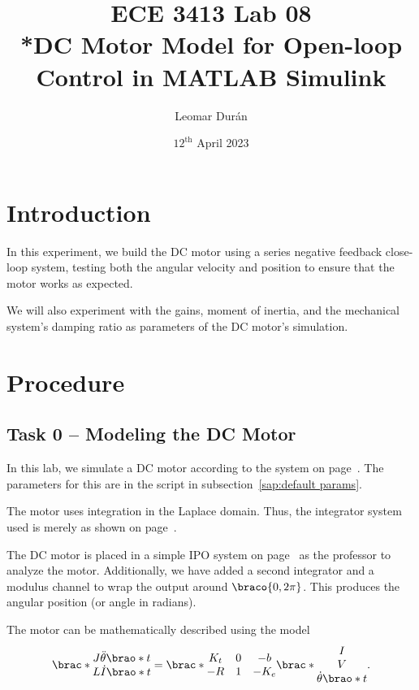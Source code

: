 \documentclass[12pt]{article}
\title{ECE 3413 Lab 08\\*DC Motor Model for Open-loop Control in MATLAB Simulink}
\author{Leomar Dur\'an}
\date{${12}^{\text{th}}$ April 2023}
\DeclarePairedDelimiter\brao()%
\DeclarePairedDelimiter\brac[]%
\DeclarePairedDelimiter\braco[)%
\DeclarePairedDelimiter\braoo][%
\begin{document}
\maketitle
\newpage

\section{Introduction}

In this experiment, we build the DC motor using a series negative feedback close-loop system,
testing both the angular velocity and position to ensure that the motor works as expected.

We will also experiment with the gains, moment of inertia, and the mechanical system's damping ratio as parameters of the DC motor's simulation.

\section{Procedure}\label{sec:procedure}

\subsection{Task 0 -- Modeling the DC Motor}\label{ssc:dc motor model}

In this lab, we simulate a DC motor according to the system on page~\pageref{pdf:dc motor model}.
The parameters for this are in the script in  subsection~\ref{sap:default params}.

The motor uses integration in the Laplace domain.
Thus, the integrator system used is merely as shown on page~\pageref{pdf:integrators}.

The DC motor is placed in a simple IPO system
on page~\pageref{pdf:dc motor system}
as the professor to analyze the motor.
Additionally, we have added a second integrator and a modulus channel to wrap the output around $\braco{0, 2\pi}$.
This produces the angular position (or angle in radians).

The motor can be mathematically described using the model
\begin{equation}
    \brac*{
        \begin{matrix}
            J\ddot\theta\brao*t \\* L\dot{I}\brao*t
        \end{matrix}
    } =
    \brac*{
        \begin{matrix}
            K_t & 0 & -b \\*
            -R & 1 & -K_e \\*
        \end{matrix}
    }\brac*{
        \begin{matrix}
            I \\* V \\* \dot\theta\brao*t
        \end{matrix}
    }.
\end{equation}
\end{document}
